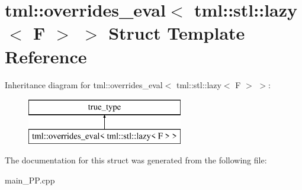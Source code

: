 \hypertarget{structtml_1_1overrides__eval_3_01tml_1_1stl_1_1lazy_3_01F_01_4_01_4}{\section{tml\+:\+:overrides\+\_\+eval$<$ tml\+:\+:stl\+:\+:lazy$<$ F $>$ $>$ Struct Template Reference}
\label{structtml_1_1overrides__eval_3_01tml_1_1stl_1_1lazy_3_01F_01_4_01_4}
}
Inheritance diagram for tml\+:\+:overrides\+\_\+eval$<$ tml\+:\+:stl\+:\+:lazy$<$ F $>$ $>$\+:\begin{figure}[H]
\begin{center}
\leavevmode
\includegraphics[height=2.000000cm]{structtml_1_1overrides__eval_3_01tml_1_1stl_1_1lazy_3_01F_01_4_01_4}
\end{center}
\end{figure}


The documentation for this struct was generated from the following file\+:\begin{DoxyCompactItemize}
\item 
main\+\_\+\+P\+P.\+cpp\end{DoxyCompactItemize}
